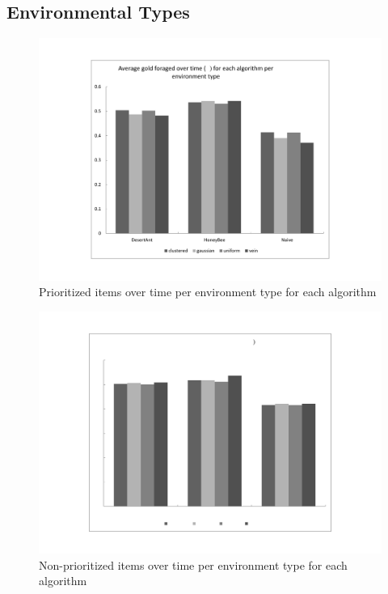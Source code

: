 \subsection{Environmental Types}
\label{results:environmentaltypes}

\begin{figure}[!htb]
\centering
\includegraphics[width=\textwidth]{chapters/chapter6/graphs/gold_environment.pdf}
\caption{Prioritized items over time per environment type for each algorithm}
\label{environmentgoldplot}
\end{figure}

\begin{figure}[!htb]
\centering
\includegraphics[width=\textwidth]{chapters/chapter6/graphs/waste_environment.pdf}
\caption{Non-prioritized items over time per environment type for each algorithm}
\label{environmentgoldplot}
\end{figure}

